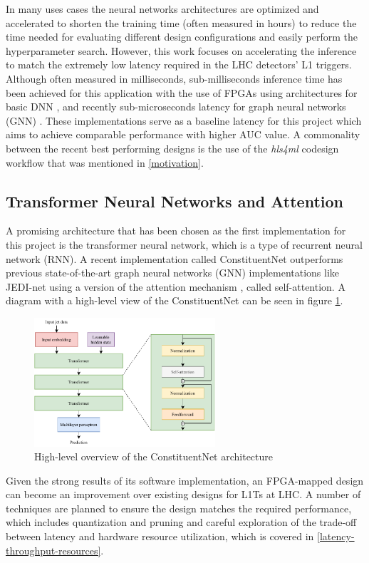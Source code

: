 In many uses cases the neural networks architectures are optimized and accelerated to shorten the training time (often measured in hours) to reduce the time needed for evaluating different design configurations and easily perform the hyperparameter search. However, this work focuses on accelerating the inference to match the extremely low latency required in the LHC detectors' L1 triggers. Although often measured in milliseconds, sub-milliseconds inference time has been achieved for this application with the use of FPGAs using architectures for basic DNN \cite{36-kreinar2018fast}, and recently sub-microseconds latency for graph neural networks (GNN) \cite{42-kreinar2020distance-weighted, 41-elabd2021graph}. These implementations serve as a baseline latency for this project which aims to achieve comparable performance with higher AUC value. A commonality between the recent best performing designs is the use of the \textit{hls4ml} codesign workflow that was mentioned in \autoref{motivation}.

\subsection{Transformer Neural Networks and Attention}
A promising architecture that has been chosen as the first implementation for this project is the transformer neural network, which is a type of recurrent neural network (RNN). A recent implementation \cite{3-yuan2021constituentnet:} called ConstituentNet outperforms previous state-of-the-art graph neural networks (GNN) implementations like JEDI-net \cite{9-newman2019jedi-net:} using a version of the attention mechanism \cite{44-vaswani2017attention}, called self-attention. A diagram with a high-level view of the ConstituentNet can be seen in figure \ref{fig:constituent-net}.

\begin{figure}[hpt!]
  \centering
  \includegraphics[trim={0cm 0cm 0cm 0cm}, width=0.6\textwidth, center]{background/constituent_net.pdf}
  \caption{High-level overview of the ConstituentNet architecture}
  \label{fig:constituent-net}
\end{figure}

Given the strong results of its software implementation, an FPGA-mapped design can become an improvement over existing designs for L1Ts at LHC. A number of techniques are planned to ensure the design matches the required performance, which includes quantization and pruning \cite{45-liang2021pruning} and careful exploration of the trade-off between latency and hardware resource utilization, which is covered in \autoref{latency-throughput-resources}.



